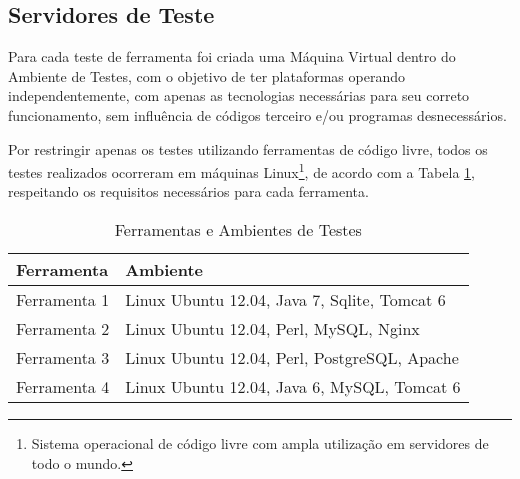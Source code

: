 \subsection{Servidores de Teste}

Para cada teste de ferramenta foi criada uma Máquina Virtual dentro do Ambiente de Testes, com o objetivo de ter plataformas operando independentemente, com apenas as tecnologias necessárias para seu correto funcionamento, sem influência de códigos terceiro e/ou programas desnecessários.

Por restringir apenas os testes utilizando ferramentas de código livre, todos os testes realizados ocorreram em máquinas Linux\footnote{Sistema operacional de código livre com ampla utilização em servidores de todo o mundo.}, de acordo com a Tabela \ref{tab:lista-servidores}, respeitando os requisitos necessários para cada ferramenta.

\begin{table}
    \caption{Ferramentas e Ambientes de Testes}
    \begin{center}
        \begin{tabular}{|p{3cm}|p{8cm}|}
            \hline \textbf{Ferramenta} & \textbf{Ambiente}\\ 
            \hline Ferramenta 1 & Linux Ubuntu 12.04, Java 7, Sqlite, Tomcat 6 \\
            \hline Ferramenta 2 & Linux Ubuntu 12.04, Perl, MySQL, Nginx \\
            \hline Ferramenta 3 & Linux Ubuntu 12.04, Perl, PostgreSQL, Apache \\
            \hline Ferramenta 4 & Linux Ubuntu 12.04, Java 6, MySQL, Tomcat 6 \\
            \hline 
        \end{tabular} 
    \end{center}
    \label{tab:lista-servidores}
\end{table}